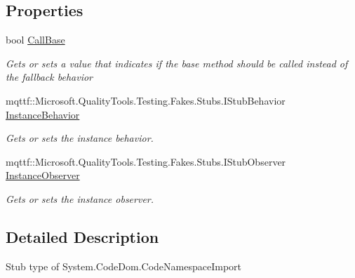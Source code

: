 \subsection*{Properties}
\begin{DoxyCompactItemize}
\item 
bool \hyperlink{class_system_1_1_code_dom_1_1_fakes_1_1_stub_code_namespace_import_a499449f10549d12646c790770a3baa5f}{Call\-Base}
\begin{DoxyCompactList}\small\item\em Gets or sets a value that indicates if the base method should be called instead of the fallback behavior\end{DoxyCompactList}\item 
mqttf\-::\-Microsoft.\-Quality\-Tools.\-Testing.\-Fakes.\-Stubs.\-I\-Stub\-Behavior \hyperlink{class_system_1_1_code_dom_1_1_fakes_1_1_stub_code_namespace_import_a4a054419025aebdf5e38dbb4a68b9142}{Instance\-Behavior}
\begin{DoxyCompactList}\small\item\em Gets or sets the instance behavior.\end{DoxyCompactList}\item 
mqttf\-::\-Microsoft.\-Quality\-Tools.\-Testing.\-Fakes.\-Stubs.\-I\-Stub\-Observer \hyperlink{class_system_1_1_code_dom_1_1_fakes_1_1_stub_code_namespace_import_a7929f50790df7159259e47fa5dd47617}{Instance\-Observer}
\begin{DoxyCompactList}\small\item\em Gets or sets the instance observer.\end{DoxyCompactList}\end{DoxyCompactItemize}


\subsection{Detailed Description}
Stub type of System.\-Code\-Dom.\-Code\-Namespace\-Import



